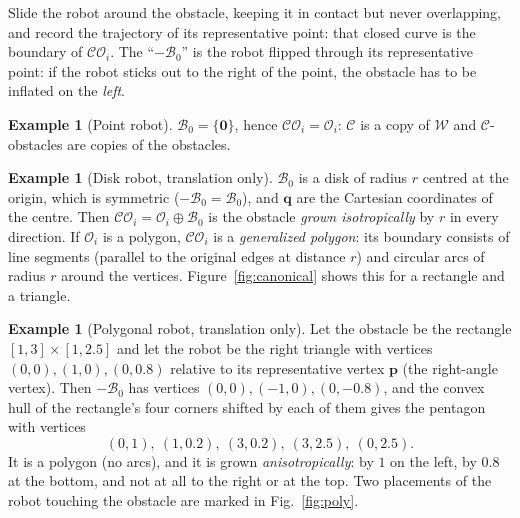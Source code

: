 \documentclass[11pt,a4paper]{article}
\newcommand{\Cspace}{\mathcal{C}}
\newcommand{\Wspace}{\mathcal{W}}
\newcommand{\CO}{\mathcal{CO}}
\newcommand{\Obs}{\mathcal{O}}
\newcommand{\Rob}{\mathcal{B}}
\newcommand{\vq}{\boldsymbol{q}}
\newcommand{\Mink}{\oplus}
\theoremstyle{definition}
\newtheorem{example}[definition]{Example}
\theoremstyle{plain}
\theoremstyle{remark}
\begin{document}
\begin{intuition}
Slide the robot around the obstacle, keeping it in contact but never overlapping, and record the trajectory of its representative point: that closed curve is the boundary of $\CO_i$. The ``$-\Rob_0$'' is the robot flipped through its representative point: if the robot sticks out to the right of the point, the obstacle has to be inflated on the \emph{left}.
\end{intuition}

\begin{example}[Point robot]
$\Rob_0=\{\mathbf 0\}$, hence $\CO_i=\Obs_i$: $\Cspace$ is a copy of $\Wspace$ and $\Cspace$-obstacles are copies of the obstacles.
\end{example}

\begin{example}[Disk robot, translation only]
$\Rob_0$ is a disk of radius $r$ centred at the origin, which is symmetric ($-\Rob_0=\Rob_0$), and $\vq$ are the Cartesian coordinates of the centre. Then $\CO_i=\Obs_i\Mink\Rob_0$ is the obstacle \emph{grown isotropically} by $r$ in every direction. If $\Obs_i$ is a polygon, $\CO_i$ is a \emph{generalized polygon}: its boundary consists of line segments (parallel to the original edges at distance $r$) and circular arcs of radius $r$ around the vertices. Figure~\ref{fig:canonical} shows this for a rectangle and a triangle.
\end{example}

\begin{example}[Polygonal robot, translation only]
\label{ex:poly}
Let the obstacle be the rectangle $[1,3]\times[1,2.5]$ and let the robot be the right triangle with vertices $(0,0),(1,0),(0,0.8)$ relative to its representative vertex $\boldsymbol p$ (the right-angle vertex). Then $-\Rob_0$ has vertices $(0,0),(-1,0),(0,-0.8)$, and the convex hull of the rectangle's four corners shifted by each of them gives the pentagon with vertices
\[
  (0,1),\ (1,0.2),\ (3,0.2),\ (3,2.5),\ (0,2.5).
\]
It is a polygon (no arcs), and it is grown \emph{anisotropically}: by $1$ on the left, by $0.8$ at the bottom, and not at all to the right or at the top. Two placements of the robot touching the obstacle are marked in Fig.~\ref{fig:poly}.
\end{example}
\end{document}
